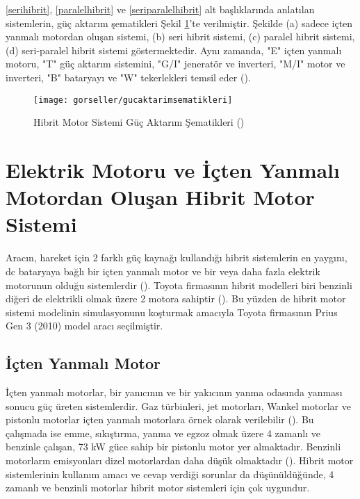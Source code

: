 \ref{serihibrit}, \ref{paralelhibrit} ve \ref{seriparalelhibrit} alt başlıklarında anlatılan sistemlerin, güç aktarım şematikleri
Şekil \ref{fig:gucaktarimsematikleri}'te verilmiştir. Şekilde (a) sadece içten yanmalı motordan oluşan sistemi, (b) seri hibrit sistemi, (c) paralel hibrit sistemi, 
(d) seri-paralel hibrit sistemi göstermektedir. Aynı zamanda, "E" içten yanmalı motoru, "T" güç aktarım sistemini, "G/I" jeneratör ve inverteri, "M/I" motor ve inverteri, "B" 
bataryayı ve "W" tekerlekleri temsil eder (\cite{hibritmotorturlerisematikleri}).

\begin{figure}
    \centering
    \texttt{[image: gorseller/gucaktarimsematikleri]}
    \caption{Hibrit Motor Sistemi Güç Aktarım Şematikleri (\cite{hibritmotorturlerisematikleri})}\label{fig:gucaktarimsematikleri}
\end{figure}



\section{Elektrik Motoru ve İçten Yanmalı Motordan Oluşan Hibrit Motor Sistemi}

Aracın, hareket için 2 farklı güç kaynağı kullandığı hibrit sistemlerin en yaygını, \acrfull{dc} bataryaya
bağlı bir içten yanmalı motor ve bir veya daha fazla elektrik motorunun olduğu sistemlerdir (\cite{gm2013}).
Toyota firmasının hibrit modelleri biri benzinli diğeri de elektrikli olmak üzere 2 motora sahiptir (\cite{toyota2020}).
Bu yüzden de hibrit motor sistemi modelinin simulasyonunu koşturmak amacıyla 
Toyota firmasının Prius Gen 3 (2010) model aracı seçilmiştir.

\subsection{İçten Yanmalı Motor}

İçten yanmalı motorlar, bir yanıcının ve bir yakıcının yanma odasında yanması sonucu güç üreten sistemlerdir. Gaz türbinleri, jet motorları, Wankel motorlar ve
pistonlu motorlar içten yanmalı motorlara örnek olarak verilebilir (\cite{Heywood}). Bu çalışmada ise emme, sıkıştırma, yanma ve egzoz olmak üzere 4 zamanlı
ve benzinle çalışan, 73 kW güce sahip bir pistonlu motor yer almaktadır. Benzinli motorların emisyonları dizel motorlardan daha düşük olmaktadır (\cite{icctgasvsdis}). Hibrit
motor sistemlerinin kullanım amacı ve cevap verdiği sorunlar da düşünüldüğünde, 4 zamanlı ve benzinli motorlar hibrit motor sistemleri için çok uygundur.


